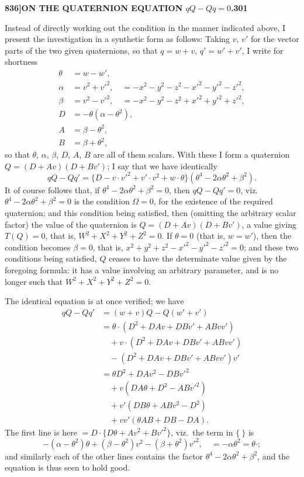 \documentclass[11pt,a4paper]{book}
\begin{document}
\noindent\textbf{836]}\hfill\textbf{ON THE QUATERNION EQUATION $qQ - Qq = 0$.}\hfill\textbf{301}

\bigskip

\noindent Instead of directly working out the condition in the manner indicated above, I present the investigation in a synthetic form as follows: Taking $v$, $v'$ for the vector parts of the two given quaternions, so that $q = w + v$, $q' = w' + v'$, I write for shortness
\begin{align*}
\theta &= w - w', \\
\alpha &= v^2 + v'^2, \quad = -x^2 - y^2 - z^2 - x'^2 - y'^2 - z'^2, \\
\beta &= v^2 - v'^2, \quad = -x^2 - y^2 - z^2 + x'^2 + y'^2 + z'^2, \\
D &= -\theta(\alpha - \theta^2), \\
A &= \beta - \theta^2, \\
B &= \beta + \theta^2,
\end{align*}
so that $\theta$, $\alpha$, $\beta$, $D$, $A$, $B$ are all of them scalars. With these I form a quaternion $Q = (D + Av)(D + Bv')$; I say that we have identically
\[
qQ - Qq' = \{D - v \cdot v'^2 + v' \cdot v^2 + w \cdot \theta\}(\theta^4 - 2\alpha\theta^2 + \beta^2).
\]
It of course follows that, if $\theta^4 - 2\alpha\theta^2 + \beta^2 = 0$, then $qQ - Qq' = 0$, viz.\ $\theta^4 - 2\alpha\theta^2 + \beta^2 = 0$ is the condition $\Omega = 0$, for the existence of the required quaternion; and this condition being satisfied, then (omitting the arbitrary scalar factor) the value of the quaternion is $Q = (D + Av)(D + Bv')$, a value giving $T(Q) = 0$, that is, $W^2 + X^2 + Y^2 + Z^2 = 0$. If $\theta = 0$ (that is, $w = w'$), then the condition becomes $\beta = 0$, that is, $x^2 + y^2 + z^2 - x'^2 - y'^2 - z'^2 = 0$; and these two conditions being satisfied, $Q$ ceases to have the determinate value given by the foregoing formula: it has a value involving an arbitrary parameter, and is no longer such that $W^2 + X^2 + Y^2 + Z^2 = 0$.

The identical equation is at once verified; we have
\begin{align*}
qQ - Qq' &= (w + v)Q - Q(w' + v') \\
&= \theta \cdot (D^2 + DAv + DBv' + ABvv') \\
&\quad + v \cdot (D^2 + DAv + DBv' + ABvv') \\
&\quad - (D^2 + DAv + DBv' + ABvv') v' \\
&= \theta D^2 + DAv^2 - DBv'^2 \\
&\quad + v(DA\theta + D^2 - ABv'^2) \\
&\quad + v'(DB\theta + ABv^2 - D^2) \\
&\quad + vv'(\theta AB + DB - DA).
\end{align*}
The first line is here $= D \cdot \{D\theta + Av^2 + Bv'^2\}$, viz.\ the term in $\{\ \}$ is
\[
-(\alpha - \theta^2)\theta + (\beta - \theta^2)v^2 - (\beta + \theta^2)v'^2, \quad = -\alpha\theta^2 = \theta \cdot ;
\]
and similarly each of the other lines contains the factor $\theta^4 - 2\alpha\theta^2 + \beta^2$, and the equation is thus seen to hold good.
\end{document}

